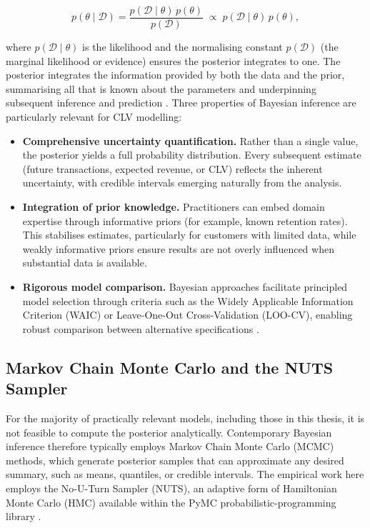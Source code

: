 \documentclass[12pt, a4paper, oneside]{report}
\begin{document}
\begin{equation}
  p(\theta \mid \mathcal{D}) = \frac{p(\mathcal{D} \mid \theta)\, p(\theta)}{p(\mathcal{D})} \;\propto\; p(\mathcal{D} \mid \theta)\, p(\theta),
  \label{eq:bayes}
\end{equation}

where $p(\mathcal{D} \mid \theta)$ is the likelihood and the normalising constant $p(\mathcal{D})$ (the marginal likelihood or evidence) ensures the posterior integrates to one. The posterior integrates the information provided by both the data and the prior, summarising all that is known about the parameters and underpinning subsequent inference and prediction \parencite{gelman2013}. Three properties of Bayesian inference are particularly relevant for CLV modelling:

\begin{itemize}
  \item \textbf{Comprehensive uncertainty quantification.} Rather than a single value, the posterior yields a full probability distribution. Every subsequent estimate (future transactions, expected revenue, or CLV) reflects the inherent uncertainty, with credible intervals emerging naturally from the analysis.
  \item \textbf{Integration of prior knowledge.} Practitioners can embed domain expertise through informative priors (for example, known retention rates). This stabilises estimates, particularly for customers with limited data, while weakly informative priors ensure results are not overly influenced when substantial data is available.
  \item \textbf{Rigorous model comparison.} Bayesian approaches facilitate principled model selection through criteria such as the Widely Applicable Information Criterion (WAIC) or Leave-One-Out Cross-Validation (LOO-CV), enabling robust comparison between alternative specifications \parencite{vehtari2017}.
\end{itemize}

\subsection{Markov Chain Monte Carlo and the NUTS Sampler}
\label{sec:mcmc}

For the majority of practically relevant models, including those in this thesis, it is not feasible to compute the posterior analytically. Contemporary Bayesian inference therefore typically employs Markov Chain Monte Carlo (MCMC) methods, which generate posterior samples that can approximate any desired summary, such as means, quantiles, or credible intervals. The empirical work here employs the No-U-Turn Sampler (NUTS), an adaptive form of Hamiltonian Monte Carlo (HMC) available within the PyMC probabilistic-programming library \parencite{hoffman2014, salvatier2016}.
\end{document}
